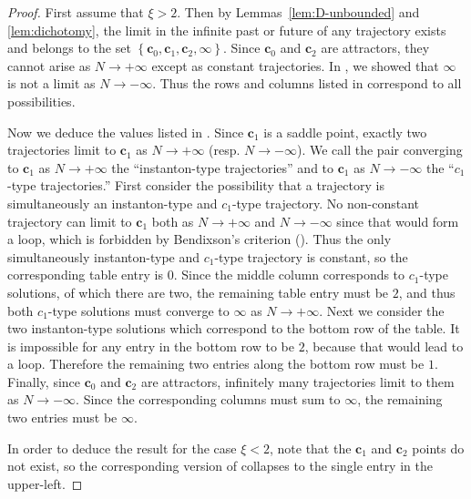 \begin{proof}
First assume that $\xi>2$. Then by Lemmas~\ref{lem:D-unbounded} and \ref{lem:dichotomy}, the limit in the infinite past or future of any trajectory exists and belongs to the set $\left\{ \mathbf{c}_{0},\mathbf{c}_{1},\mathbf{c}_{2},\bm{\infty}\right\} $. Since $\mathbf{c}_{0}$ and $\mathbf{c}_{2}$ are attractors, they cannot arise as $N\to+\infty$ except as constant trajectories. In , we showed that $\infty$ is not a limit as $N\to-\infty$. Thus the rows and columns listed in  correspond to all possibilities. 

Now we deduce the values listed in . Since $\mathbf{c}_{1}$ is a saddle point, exactly two trajectories limit to $\mathbf{c}_{1}$ as $N\to+\infty$ (resp. $N\to-\infty$). We call the pair converging to $\mathbf{c}_{1}$ as $N\to+\infty$ the ``instanton-type trajectories'' and to $\mathbf{c}_{1}$ as $N\to-\infty$ the ``$c_{1}$\nobreakdash-type trajectories.'' First consider the possibility that a trajectory is simultaneously an instanton-type and $c_{1}$\nobreakdash-type trajectory. No non-constant trajectory can limit to $\mathbf{c}_{1}$ both as $N\to+\infty$ and $N\to-\infty$ since that would form a loop, which is forbidden by Bendixson's criterion (). Thus the only simultaneously instanton-type and $c_{1}$\nobreakdash-type trajectory is constant, so the corresponding table entry is $0$. Since the middle column corresponds to $c_{1}$\nobreakdash-type solutions, of which there are two, the remaining table entry must be $2$, and thus both $c_{1}$\nobreakdash-type solutions must converge to $\bm{\infty}$ as $N\to+\infty$. Next we consider the two instanton-type solutions which correspond to the bottom row of the table. It is impossible for any entry in the bottom row to be $2$, because that would lead to a loop. Therefore the remaining two entries along the bottom row must be $1$. Finally, since $\mathbf{c}_{0}$ and $\mathbf{c}_{2}$ are attractors, infinitely many trajectories limit to them as $N\to-\infty$. Since the corresponding columns must sum to $\infty$, the remaining two entries must be $\infty$. 

In order to deduce the result for the case $\xi<2$, note that the $\mathbf{c}_{1}$ and $\mathbf{c}_{2}$ points do not exist, so the corresponding version of  collapses to the single entry in the upper-left. 
\end{proof}
